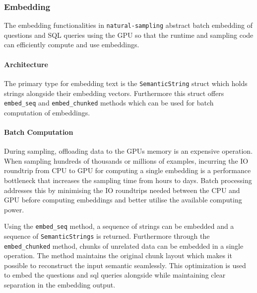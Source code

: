 \subsubsection{Embedding}

The embedding functionalities in \texttt{natural-sampling} abstract batch embedding
of questions and SQL queries using the GPU so that the runtime and sampling code
can efficiently compute and use embeddings.

\paragraph{Architecture}

The primary type for embedding text is the \texttt{SemanticString} struct which
holds strings alongside their embedding vectors. Furthermore this struct offers
\texttt{embed\_seq} and \texttt{embed\_chunked} methods which can be used for
batch computation of embeddings.

\paragraph{Batch Computation}

During sampling, offloading data to the GPUs memory is an expensive operation.
When sampling hundreds of thousands or millions of examples, incurring the IO
roundtrip from CPU to GPU for computing a single embedding is a performance
bottleneck that increases the sampling time from hours to days. Batch
processing addresses this by minimising the IO roundtrips needed between the
CPU and GPU before computing embeddings and better utilise the available
computing power.

Using the \texttt{embed\_seq} method, a sequence of strings can be embedded and
a sequence of \texttt{SemanticStrings} is returned. Furthermore through the
\texttt{embed\_chunked} method, chunks of unrelated data can be embedded in a
single operation. The method maintains the original chunk layout which makes it
possible to reconstruct the input semantic seamlessly. This optimization is
used to embed the questions and sql queries alongside while maintaining clear
separation in the embedding output.

